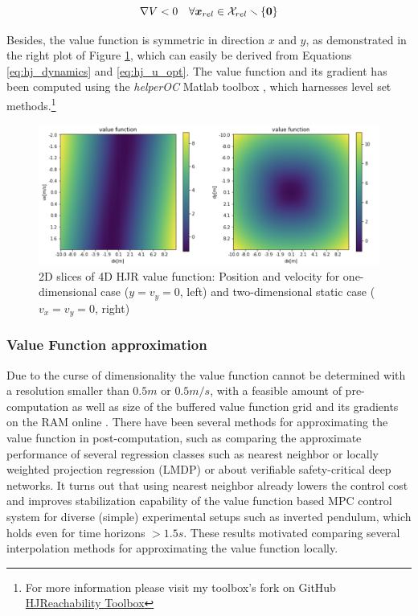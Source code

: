 \begin{equation}
\nabla V < 0 \quad \forall \boldsymbol{x}_{rel} \in \mathcal{X}_{rel} \smallsetminus \{ \boldsymbol{0} \}
\label{eq:hj_value_negative}
\end{equation}

Besides, the value function is symmetric in direction $x$ and $y$, as demonstrated in the right plot of Figure \ref{img:hj_value_function}, which can easily be derived from Equations \ref{eq:hj_dynamics} and \ref{eq:hj_u_opt}. The value function and its gradient has been computed using the \textit{helperOC} Matlab toolbox \cite{Bansal2017}, which harnesses level set methods.\footnote{For more information please visit my toolbox's fork on GitHub \href{https://github.com/simon-schaefer/HJReachibility}{HJReachability Toolbox}}

\begin{figure}[!ht]
\begin{center}
\includegraphics[width=\imgwidth]{images/hj_value_function.png}
\caption{2D slices of 4D \ac{HJR} value function: Position and velocity for one-dimensional case ($y = v_y = 0$, left) and two-dimensional static case ($v_x = v_y = 0$, right)}
\label{img:hj_value_function}
\end{center}
\end{figure}

\subsubsection{Value Function approximation}
Due to the curse of dimensionality the value function cannot be determined with a resolution smaller than $0.5 m$ or $0.5 m/s$, with a feasible amount of pre-computation as well as size of the buffered value function grid and its gradients  on the RAM online \cite{Pavone2020}. There have been several methods for  approximating the value function in post-computation, such as \cite{Zhong2013} comparing the approximate performance of several regression classes such as nearest neighbor or locally weighted projection regression (LMDP) or \cite{Kuper2018} about verifiable safety-critical deep networks. It turns out that using nearest neighbor already lowers the control cost and improves stabilization capability of the value function based MPC control system for diverse (simple) experimental setups such as inverted pendulum, which holds even for time horizons $> 1.5s$. These results motivated comparing several interpolation methods for approximating the value function locally.

